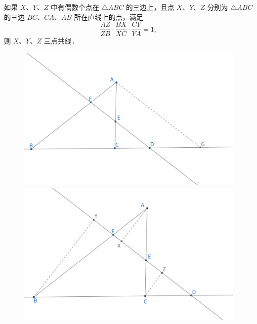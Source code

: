\begin{theorem}
如果 $X 、 Y 、 Z$ 中有偶数个点在 $\triangle A B C$ 的三边上，且点 $X 、 Y 、 Z$ 分别为 $\triangle A B C$ 的三边 $B C 、 C A 、 A B$ 所在直线上的点，满足 
$$\frac{A Z}{Z B} \cdot \frac{B X}{X C} \cdot \frac{C Y}{Y A}=1,$$
则 $X 、 Y 、 Z$ 三点共线．
\end{theorem}



\begin{figure}[htbp]
    \centering
    \hfill %
    \begin{minipage}[t]{0.45\textwidth}
        \centering
        \includegraphics[width=\linewidth]{figures/menelaus辅助线1.png}
    \end{minipage}
    \hfill %
    \begin{minipage}[t]{0.45\textwidth}
    \centering
    \includegraphics[width=\linewidth]{figures/menelaus辅助线2.png}
    \end{minipage}
\end{figure}

